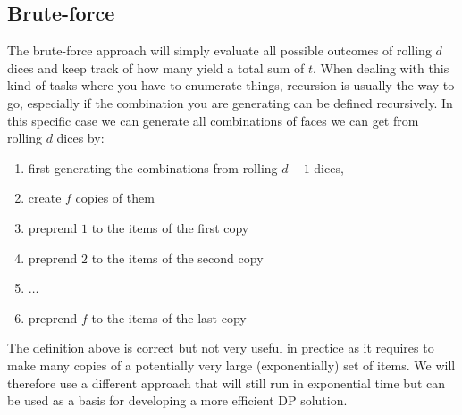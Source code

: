 \subsection{Brute-force}
\label{dice_rolls:sec:bruteforce}
The brute-force approach will simply evaluate all possible outcomes of rolling $d$ dices and keep
track of how many yield a total sum of $t$. When dealing with this kind of tasks where you have to
enumerate things, recursion is usually the way to go, especially if the combination you are
generating can be defined recursively. In this specific case we can generate all combinations of
faces we can get from rolling $d$ dices by:
\begin{enumerate}
	\item first generating the combinations from rolling $d-1$ dices,
	\item create $f$ copies of them
	\item preprend $1$ to the items of the first copy
	\item preprend $2$ to the items of the second copy
	\item $\ldots$
	\item preprend $f$ to the items of the last copy
\end{enumerate}
The definition above is correct but not very useful in prectice as it requires to make many copies
of a potentially very large (exponentially) set of items. We will therefore use a different approach
that will still run in exponential time but can be used as a basis for developing a more efficient
DP solution.

